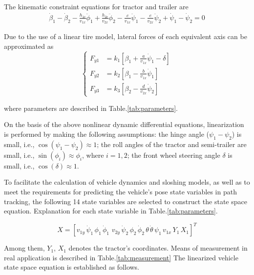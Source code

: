 The kinematic constraint equations for tractor and trailer are
\begin{equation}
\begin{split}
\dot{\beta}_1 - \dot{\beta}_2 - \frac{h_{1c}}{v_{1x}} \ddot{\phi}_1 + \frac{h_{2c}}{v_{2x}} \ddot{\phi}_2 - \frac{c}{v_{1x}} \ddot{\psi}_1 - \frac{e}{v_{2x}} \ddot{\psi}_2 + \dot{\psi}_1 - \dot{\psi}_2 = 0  
\end{split}
\end{equation}

Due to the use of a linear tire model, lateral forces of each equivalent axis can be approximated as
\begin{equation}
\left\{\begin{split}
F_{y1} &= k_1 [\beta_1 + \frac{a}{v_{1x}} \dot{\psi}_1  - \delta ] \\
F_{y2} &= k_2 [\beta_1 - \frac{b}{v_{1x}} \dot{\psi}_1] \\
F_{y3} &= k_3 [\beta_2 - \frac{d}{v_{2x}} \dot{\psi}_2]
\end{split}\right.
\end{equation}

where parameters are described in Table.\ref{tab:parameters}.

On the basis of the above nonlinear dynamic differential equations, linearization is performed by making the following assumptions: the hinge angle ($\psi_1-\psi_2$) is small, i.e., $\cos(\psi_1-\psi_2)\approx 1$; the roll angles of the tractor and semi-trailer are small, i.e., $\sin(\phi_i)\approx \phi_i$, where $i=1,2$; the front wheel steering angle $\delta$ is small, i.e., $\cos(\delta)\approx 1$. 

To facilitate the calculation of vehicle dynamics and sloshing models, as well as to meet the requirements for predicting the vehicle's pose state variables in path tracking, the following 14 state variables are selected to construct the state space equation. Explanation for each state variable in Table.\ref{tab:parameters}.

\vspace{-0.3cm}
\begin{equation}
X = \left[v_{1y}\,\dot{\psi}_1\,\phi_1\,\dot{\phi}_1\,\,v_{2y}\,\dot{\psi}_2\,\phi_2\,\dot{\phi}_2\,\theta\,\dot{\theta}\,\psi_1\,v_{1x}\,Y_1\,X_1\right]^T
\label{eq:xk}
\end{equation}
\vspace{-0.3cm}

Among them, $Y_1$, $X_1$ denotes the tractor's coordinates. Means of measurement in real application is described in Table.\ref{tab:measurement}
The linearized vehicle state space equation is established as follows. 

